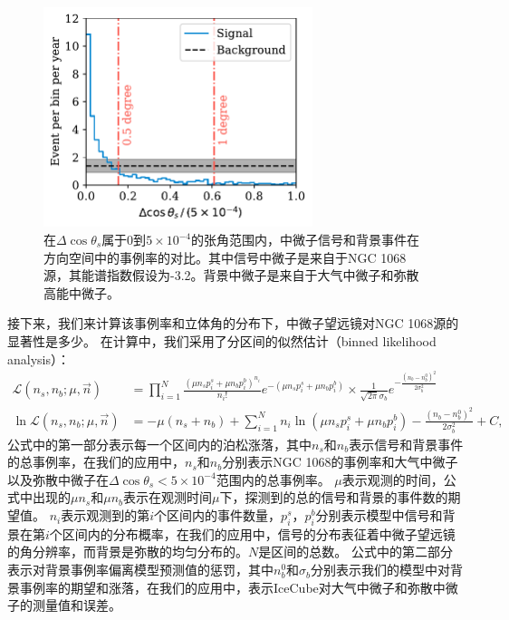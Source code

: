 \begin{figure}[!htb]%
    \centering
    \includegraphics[width=0.70\textwidth]{img/event_rate_around_source.pdf}
    \caption{在$\Delta\cos\theta_s$属于0到$5\times 10^{-4}$的张角范围内，中微子信号和背景事件在方向空间中的事例率的对比。其中信号中微子是来自于NGC 1068源，其能谱指数假设为-3.2。背景中微子是来自于大气中微子和弥散高能中微子。}
    \label{fig:event_rate_around_source}
\end{figure}

接下来，我们来计算该事例率和立体角的分布下，中微子望远镜对NGC 1068源的显著性是多少。
在计算中，我们采用了分区间的似然估计（binned likelihood analysis）：
\begin{equation}
\begin{aligned}
    \mathcal{L}(n_s, n_b;\mu, \vec{n}) &=  
    \prod^N_{i=1} \frac{(\mu n_s p_i^s + \mu n_b p_i^b)^{n_i}}{n_i!} 
    e^{-(\mu n_s p_i^s + \mu n_b p_i^b)}
    \times \frac{1}{\sqrt{2\pi}\sigma_b} e^{-\frac{(n_b-n_b^0)^2}{2\sigma_b^2}} \\
    \ln{\mathcal{L}}(n_s, n_b;\mu, \vec{n}) &= 
    -\mu(n_s+n_b) + \sum^N_{i=1} n_i \ln (\mu n_s p_i^s + \mu n_b p_i^b) 
    - \frac{(n_b-n_b^0)^2}{2\sigma_b^2} + C ,
    \label{eq:binned_likelihood}
\end{aligned}
\end{equation}
公式中的第一部分表示每一个区间内的泊松涨落，其中$n_s$和$n_b$表示信号和背景事件的总事例率，在我们的应用中，$n_s$和$n_b$分别表示NGC 1068的事例率和大气中微子以及弥散中微子在$\Delta\cos\theta_s < 5\times 10^{-4}$范围内的总事例率。
$\mu$表示观测的时间，公式中出现的$\mu n_s$和$\mu n_b$表示在观测时间$\mu$下，探测到的总的信号和背景的事件数的期望值。
$n_i$表示观测到的第$i$个区间内的事件数量，$p_i^s$，$p_i^b$分别表示模型中信号和背景在第$i$个区间内的分布概率，在我们的应用中，信号的分布表征着中微子望远镜的角分辨率，而背景是弥散的均匀分布的。$N$是区间的总数。
公式中的第二部分表示对背景事例率偏离模型预测值的惩罚，其中$n_b^0$和$\sigma_b$分别表示我们的模型中对背景事例率的期望和涨落，在我们的应用中，表示IceCube对大气中微子和弥散中微子的测量值和误差。

